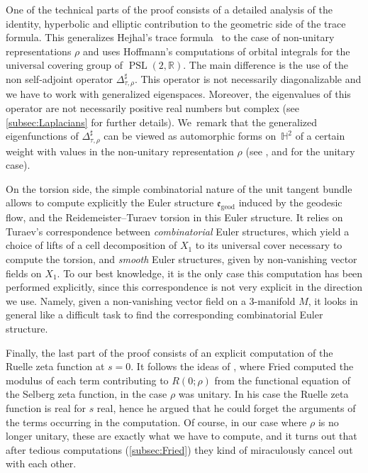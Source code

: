 \documentclass[JEP,XML,SOM,Unicode,NoFloatCountersInSection,published]{cedram}
\theoremstyle{plain}
\theoremstyle{definition}
\theoremstyle{remark}
\newcommand{\R}{\mathbb{R}}
\renewcommand{\H}{\mathbb{H}}
\newcommand{\geod}{\mathrm{geod}}
\DeclareMathOperator{\PSL}{PSL}
\numberwithin{equation}{section}
\begin{document}
One of the technical parts of the proof consists of a detailed analysis of the identity, hyperbolic and elliptic contribution to the geometric side of the trace formula. This generalizes Hejhal's trace formula~\cite[Ch.\,9, Th.\,6.2]{He2} to the case of non-unitary representations $\rho$ and uses Hoffmann's computations of orbital integrals for the universal covering group of $\PSL(2,\R)$. The main difference is the use of the non self-adjoint oper\-ator $\Delta_{\tau,\rho}^\sharp$. This operator is not necessarily diagonalizable and we have to work with generalized eigenspaces. Moreover, the eigenvalues of this operator are not necessarily positive real numbers but complex (see \cref{subsec:Laplacians} for further details).
We~remark that the generalized eigenfunctions of $\Delta_{\tau,\rho}^\sharp$ can be viewed as automorphic forms on~$\H^2$ of a certain weight with values in the non-unitary representation $\rho$ (see \cite[Ch.\,9]{He2}, and \cite{Hof94} for the unitary case).

On the torsion side, the simple combinatorial nature of the unit tangent bundle allows to compute explicitly the Euler structure $\mathfrak e_{\geod}$ induced by the geodesic flow, and the Reidemeister--Turaev torsion in this Euler structure. It relies on Turaev's correspondence between \emph{combinatorial} Euler structures, which yield a choice of lifts of a cell decomposition of $X_1$ to its universal cover necessary to compute the torsion, and \emph{smooth} Euler structures, given by non-vanishing vector fields on $X_1$.
To our best knowledge, it is the only case this computation has been performed explicitly, since this correspondence is not very explicit in the direction we use. Namely, given a non-vanishing vector field on a 3\nobreakdash-manifold $M$, it looks in general like a difficult task to find the corresponding combinatorial Euler structure.

Finally, the last part of the proof consists of an explicit computation of the Ruelle zeta function at $s=0$. It follows the ideas of \cite[\S 3]{fried1986fuchsian}, where Fried computed the modulus of each term contributing to $R(0;\rho)$ from the functional equation of the Selberg zeta function, in the case $\rho$ was unitary. In his case the Ruelle zeta function is real for $s$ real, hence he argued that he could forget the arguments of the terms occurring in the computation. Of course, in our case where $\rho$ is no longer unitary, these are exactly what we have to compute, and it turns out that after tedious computations (\cref{subsec:Fried}) they kind of miraculously cancel out with each other.
\end{document}
